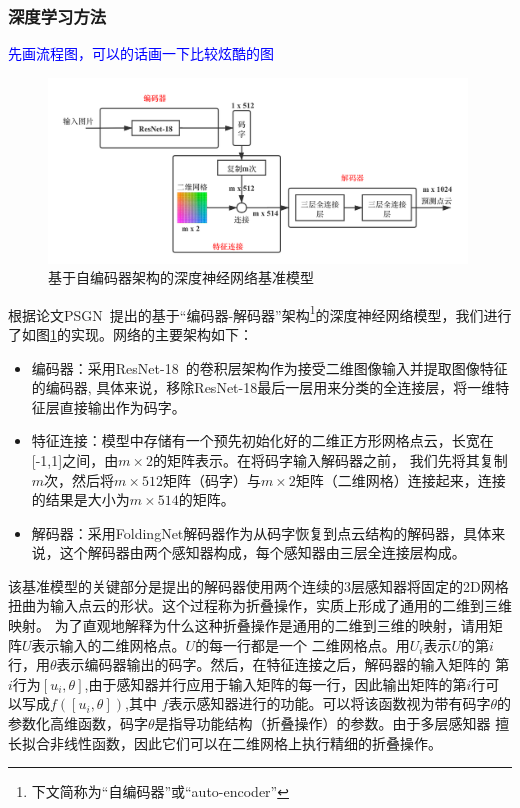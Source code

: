\documentclass[bachelor, nocolorlinks, printoneside]{seuthesis} %
\newcommand\TODO[1]{\textcolor{blue}{#1}}
\begin{document}
\begin{Main}
\subsubsection{深度学习方法}
\TODO{先画流程图，可以的话画一下比较炫酷的图}
\begin{figure}
    \centering
    \includegraphics[width=0.99\textwidth]{figs/model/ae_baseline_grid.png} 
    \caption{基于自编码器架构的深度神经网络基准模型}
    \label{fig:ae_baseline}
\end{figure}
根据论文PSGN~\cite{fan2017point}提出的基于“编码器-解码器”架构\footnote[1]{下文简称为“自编码器”或“auto-encoder”}的深度神经网络模型，我们进行了如图\ref{fig:ae_baseline}的实现。网络的主要架构如下：
\begin{itemize}
\item 编码器：采用ResNet-18~\cite{He_2016}的卷积层架构作为接受二维图像输入并提取图像特征的编码器, 具体来说，移除ResNet-18最后一层用来分类的全连接层，将一维特征层直接输出作为码字。
\item 特征连接：模型中存储有一个预先初始化好的二维正方形网格点云，长宽在[-1,1]之间，由$m \times 2$的矩阵表示。在将码字输入解码器之前，
我们先将其复制$m$次，然后将$m \times 512$矩阵（码字）与$m \times 2$矩阵（二维网格）连接起来，连接的结果是大小为$m \times 514$的矩阵。
\item 解码器：采用FoldingNet解码器\cite{yang2018foldingnet}作为从码字恢复到点云结构的解码器，具体来说，这个解码器由两个感知器构成，每个感知器由三层全连接层构成。
\end{itemize}

该基准模型的关键部分是提出的解码器使用两个连续的3层感知器将固定的2D网格扭曲为输入点云的形状。这个过程称为折叠操作，实质上形成了通用的二维到三维映射。
为了直观地解释为什么这种折叠操作是通用的二维到三维的映射，请用矩阵$U$表示输入的二维网格点。$U$的每一行都是一个
二维网格点。用$U_i$表示$U$的第$i$行，用$\theta$表示编码器输出的码字。然后，在特征连接之后，解码器的输入矩阵的
第$i$行为$[u_i,\theta]$,由于感知器并行应用于输入矩阵的每一行，因此输出矩阵的第$i$行可以写成$f([u_i,\theta])$,其中
$f$表示感知器进行的功能。可以将该函数视为带有码字$\theta$的参数化高维函数，码字$\theta$是指导功能结构（折叠操作）的参数。由于多层感知器
擅长拟合非线性函数，因此它们可以在二维网格上执行精细的折叠操作。


\end{Main}
\end{document}
